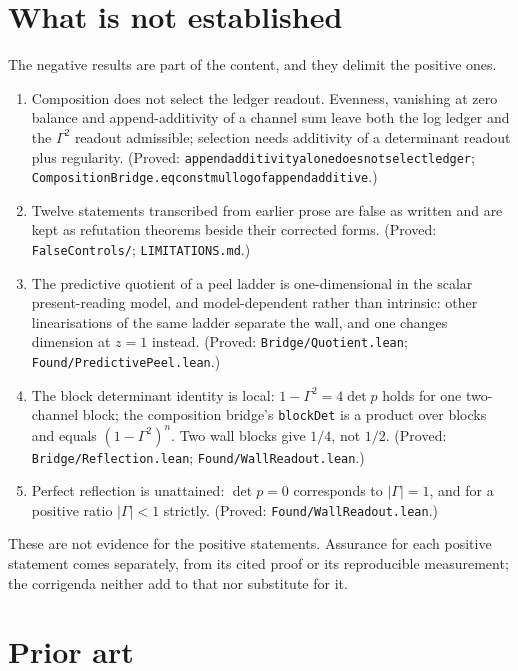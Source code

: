 \documentclass[11pt]{article}
\newcommand{\G}{\Gamma}
\renewcommand{\_}{\origunderscore\allowbreak}
\begin{document}
\section{What is not established}

The negative results are part of the content, and they delimit the positive ones.
\begin{enumerate}[label=\arabic*.,leftmargin=2em]
\item Composition does not select the ledger readout. Evenness, vanishing at zero balance and
  append-additivity of a channel sum leave both the log ledger and the $\G^2$ readout admissible;
  selection needs additivity of a determinant readout plus regularity. (Proved:
  \texttt{append\_additivity\_alone\_does\_not\_select\_ledger};
  \texttt{CompositionBridge.eq\_const\_mul\_log\_of\_append\_additive}.)
\item Twelve statements transcribed from earlier prose are false as written and are kept as
  refutation theorems beside their corrected forms. (Proved: \texttt{FalseControls/};
  \texttt{LIMITATIONS.md}.)
\item The predictive quotient of a peel ladder is one-dimensional in the scalar present-reading
  model, and model-dependent rather than intrinsic: other linearisations of the same ladder
  separate the wall, and one changes dimension at $z=1$ instead. (Proved:
  \texttt{Bridge/Quotient.lean}; \texttt{Found/PredictivePeel.lean}.)
\item The block determinant identity is local: $1-\G^2=4\det p$ holds for one two-channel block;
  the composition bridge's \texttt{blockDet} is a product over blocks and equals $(1-\G^2)^n$. Two
  wall blocks give $1/4$, not $1/2$. (Proved: \texttt{Bridge/Reflection.lean};
  \texttt{Found/WallReadout.lean}.)
\item Perfect reflection is unattained: $\det p=0$ corresponds to $|\G|=1$, and for a positive
  ratio $|\G|<1$ strictly. (Proved: \texttt{Found/WallReadout.lean}.)
\end{enumerate}
These are not evidence for the positive statements. Assurance for each positive statement comes
separately, from its cited proof or its reproducible measurement; the corrigenda neither add to
that nor substitute for it.

\section{Prior art}\label{sec:prior}
\end{document}
